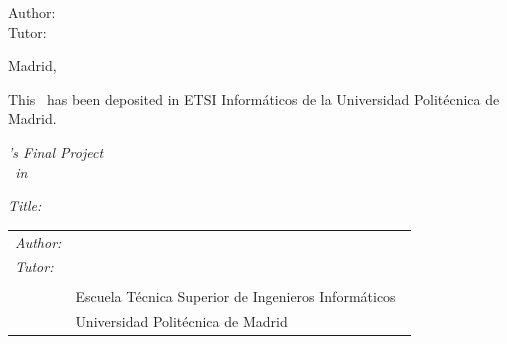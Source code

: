 \begin{titlepage}
\vspace*{5cm}

\noindent
\large{Author: \AuthorName{} }\\
\large{Tutor: \NombreTutor{} }

\vspace*{3cm}
\begin{center}
Madrid, \Date
\end{center}

\clearpage

\thispagestyle{empty}
\noindent
This \Studies\ has been deposited in ETSI Informáticos de la Universidad Politécnica de Madrid.

\vspace*{4cm}

\noindent
\textit{\Studies 's Final Project}\\
\textit{\Studies\ in \StudiesTitle}

\begin{minipage}[t]{0.1\linewidth}
  \textit{Title:}
\end{minipage}
\begin{minipage}[t]{0.88\linewidth}
  \ThesisTitle
\end{minipage}

\Date

\vspace*{4cm}

\noindent
\begin{tabular}{lp{0.85\linewidth}}
  \textit{Author:} & \AuthorName{}  \\
  \textit{Tutor:} & \NombreTutor{}  \\
                  & \Department{} \\
                  & Escuela Técnica Superior de Ingenieros Informáticos\\
                  & Universidad Politécnica de Madrid
\end{tabular}
\end{titlepage}
